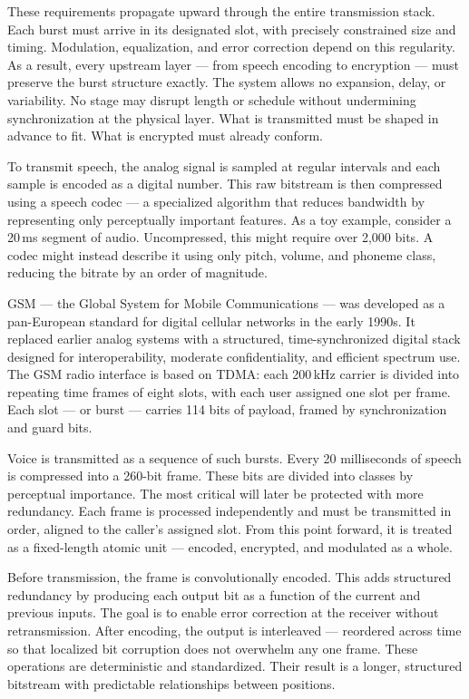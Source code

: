 These requirements propagate upward through the entire transmission stack. Each burst must arrive in its designated slot, with precisely constrained size and timing. Modulation, equalization, and error correction depend on this regularity. As a result, every upstream layer — from speech encoding to encryption — must preserve the burst structure exactly. The system allows no expansion, delay, or variability. No stage may disrupt length or schedule without undermining synchronization at the physical layer. What is transmitted must be shaped in advance to fit. What is encrypted must already conform.

To transmit speech, the analog signal is sampled at regular intervals and each sample is encoded as a digital number. This raw bitstream is then compressed using a speech codec — a specialized algorithm that reduces bandwidth by representing only perceptually important features. As a toy example, consider a 20 ms segment of audio. Uncompressed, this might require over 2,000 bits. A codec might instead describe it using only pitch, volume, and phoneme class, reducing the bitrate by an order of magnitude.

GSM — the Global System for Mobile Communications — was developed as a pan-European standard for digital cellular networks in the early 1990s. It replaced earlier analog systems with a structured, time-synchronized digital stack designed for interoperability, moderate confidentiality, and efficient spectrum use. The GSM radio interface is based on TDMA: each 200 kHz carrier is divided into repeating time frames of eight slots, with each user assigned one slot per frame. Each slot — or burst — carries 114 bits of payload, framed by synchronization and guard bits.

Voice is transmitted as a sequence of such bursts. Every 20 milliseconds of speech is compressed into a 260-bit frame. These bits are divided into classes by perceptual importance. The most critical will later be protected with more redundancy. Each frame is processed independently and must be transmitted in order, aligned to the caller’s assigned slot. From this point forward, it is treated as a fixed-length atomic unit — encoded, encrypted, and modulated as a whole.

Before transmission, the frame is convolutionally encoded. This adds structured redundancy by producing each output bit as a function of the current and previous inputs. The goal is to enable error correction at the receiver without retransmission. After encoding, the output is interleaved — reordered across time so that localized bit corruption does not overwhelm any one frame. These operations are deterministic and standardized. Their result is a longer, structured bitstream with predictable relationships between positions.

